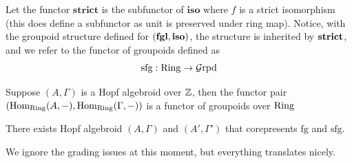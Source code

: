    Let the functor $\mathbf{strict}$ is the subfunctor of $\mathbf{iso}$ where $f$ is a strict isomorphism (this does define a subfunctor as unit is preserved under ring map). Notice, with the groupoid structure defined for $(\operatorname{\mathbf{fgl}}, \operatorname{\mathbf{iso}})$, the structure is inherited by $\operatorname{\mathbf{strict}}$, and we refer to the functor of groupoids defined as
   \[
   \mathrm{sfg}: \mathrm{Ring} \to \operatorname{\mathcal{G}rpd}
   \]
\begin{lemma}
    Suppose $(A,\Gamma)$ is a Hopf algebroid over $\mathbb{Z}$, then the functor pair $(\operatorname{Hom}_{\mathrm{Ring}}(A,-),\operatorname{Hom}_{\mathrm{Ring}}(\Gamma, -))$ is a functor of groupoids over $\mathrm{Ring}$
\end{lemma}

\begin{proposition}
    There exists Hopf algebroid $(A, \Gamma)$ and $(A', \Gamma')$ that corepresents $\mathrm{fg}$ and $\mathrm{sfg}$.
\end{proposition}
We ignore the grading issues at this moment, but everything translates nicely.
